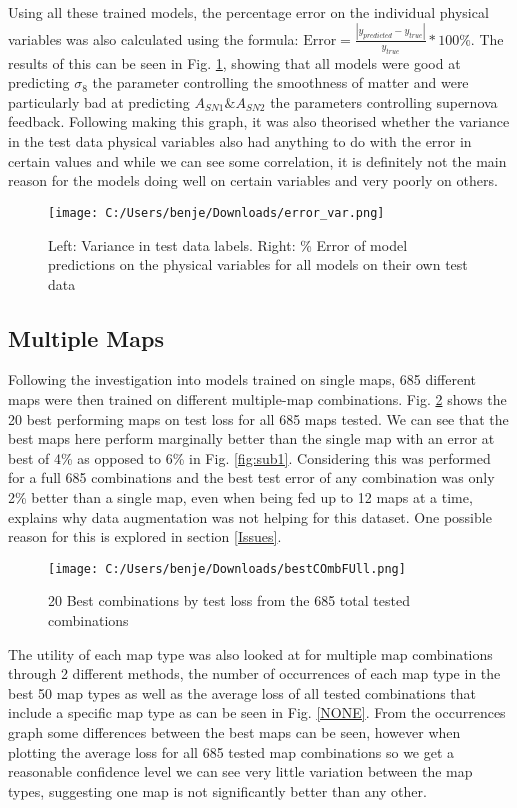 \documentclass[11pt]{scrartcl}
\begin{document}
Using all these trained models, the percentage error on the individual physical variables was also calculated using the formula: $\textrm{Error} = \frac{|y_{predicted} - y_{true}|}{y_{true}} * 100\%$. The results of this can be seen in Fig. \ref{errVar}, showing that all models were good at predicting $\sigma_8$ the parameter controlling the smoothness of matter and were particularly bad at predicting $A_{SN1} \& A_{SN2}$ the parameters controlling supernova feedback. Following making this graph, it was also theorised whether the variance in the test data physical variables also had anything to do with the error in certain values and while we can see some correlation, it is definitely not the main reason for the models doing well on certain variables and very poorly on others. 


\begin{figure}[H]
\centering
\texttt{[image: C:/Users/benje/Downloads/error\_var.png]}
\caption{Left: Variance in test data labels. Right: \% Error of model predictions on the physical variables for all models on their own test data}
\label{errVar}
\end{figure}

\subsection{Multiple Maps}

Following the investigation into models trained on single maps, 685 different maps were then trained on different multiple-map combinations. Fig. \ref{bestMult} shows the 20 best performing maps on test loss for all 685 maps tested. We can see that the best maps here perform marginally better than the single map with an error at best of 4\% as opposed to 6\% in Fig. \ref{fig:sub1}. Considering this was performed for a full 685 combinations and the best test error of any combination was only 2\% better than a single map, even when being fed up to 12 maps at a time, explains why data augmentation was not helping for this dataset. One possible reason for this is explored in section \ref{Issues}.

\begin{figure}[H]
\centering
\texttt{[image: C:/Users/benje/Downloads/bestCOmbFUll.png]}
\caption{20 Best combinations by test loss from the 685 total tested combinations}
\label{bestMult}
\end{figure}

The utility of each map type was also looked at for multiple map combinations through 2 different methods, the number of occurrences of each map type in the best 50 map types as well as the average loss of all tested combinations that include a specific map type as can be seen in Fig. \ref{NONE}. From the occurrences graph some differences between the best maps can be seen, however when plotting the average loss for all 685 tested map combinations so we get a reasonable confidence level we can see very little variation between the map types, suggesting one map is not significantly better than any other.
\end{document}
